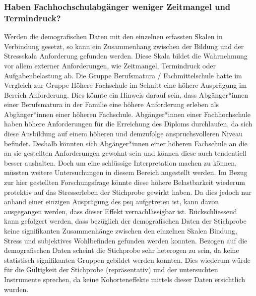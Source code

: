 \subsubsection{Haben Fachhochschulabgänger weniger Zeitmangel und Termindruck?}
Werden die demografischen Daten mit den einzelnen erfassten Skalen in Verbindung gesetzt, so kann ein Zusammenhang zwischen der Bildung und der Stressskala Anforderung gefunden werden. Diese Skala bildet die Wahrnehmung vor allem externer Anforderungen, wie Zeitmangel, Termindruck oder Aufgabenbelastung ab. Die Gruppe Berufsmatura / Fachmittelschule hatte im Vergleich zur Gruppe Höhere Fachschule im Schnitt eine höhere Ausprägung im Bereich Anforderung. Dies könnte ein Hinweis darauf sein, dass Abgänger*innen einer Berufsmatura in der Familie eine höhere Anforderung erleben als Abgänger*innen einer höheren Fachschule. Abgänger*innen einer Fachhochschule haben höhere Anforderungen für die Erreichung des Diploms durchlaufen, da sich diese  Ausbildung auf einem höheren und demzufolge anspruchsvolleren Niveau befindet. Deshalb könnten sich Abgänger*innen einer höheren Fachschule an die an sie gestellten Anforderungen gewohnt sein und können diese auch tendentiell besser aushalten. Doch um eine schlüssige Interpretation machen zu können, müssten weitere Untersuchungen in diesem Bereich angestellt werden. Im Bezug zur hier gestellten Forschungsfrage könnte diese höhere Belastbarkeit wiederum protektiv auf das Stresserleben der Stichprobe gewirkt haben. Da dies jedoch nur anhand einer einzigen Ausprägung des \acrshort{psq} aufgetreten ist, kann davon ausgegangen werden, dass dieser Effekt vernachlässigbar ist. Rückschliessend kann gefolgert werden, dass bezüglich der demografischen Daten der Stichprobe keine signifikanten Zusammenhänge zwischen den einzelnen Skalen Bindung, Stress und subjektives Wohlbefinden gefunden werden konnten. Bezogen auf die demografischen Daten scheint die Stichprobe sehr heterogen zu sein, da keine statistisch signifikanten Gruppen gebildet werden konnten. Dies wiederum würde für die Gültigkeit der Stichprobe (repräsentativ) und der untersuchten Instrumente sprechen, da keine Kohorteneffekte mittels dieser Daten ersichtlich wurden.

